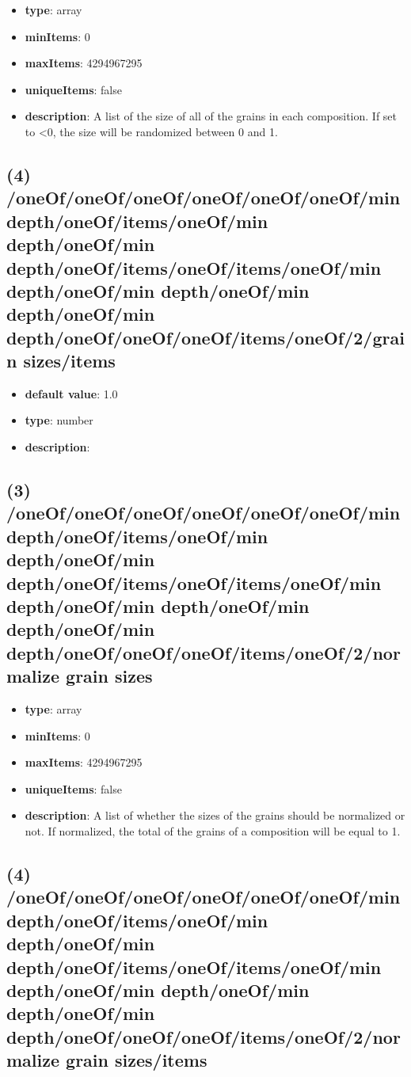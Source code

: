 \begin{itemize}[leftmargin=3em]\item {\bf type}: array
\item {\bf minItems}: 0
\item {\bf maxItems}: 4294967295
\item {\bf uniqueItems}: false
\item {\bf description}: A list of the size of all of the grains in each composition. If set to <0, the size will be randomized between 0 and 1.
\end{itemize}\subsection{(4) /oneOf/oneOf/oneOf/oneOf/oneOf/oneOf/min depth/oneOf/items/oneOf/min depth/oneOf/min depth/oneOf/items/oneOf/items/oneOf/min depth/oneOf/min depth/oneOf/min depth/oneOf/min depth/oneOf/oneOf/oneOf/items/oneOf/2/grain sizes/items}
\begin{itemize}[leftmargin=4em]\item {\bf default value}: 1.0
\item {\bf type}: number
\item {\bf description}: 
\end{itemize}\subsection{(3) /oneOf/oneOf/oneOf/oneOf/oneOf/oneOf/min depth/oneOf/items/oneOf/min depth/oneOf/min depth/oneOf/items/oneOf/items/oneOf/min depth/oneOf/min depth/oneOf/min depth/oneOf/min depth/oneOf/oneOf/oneOf/items/oneOf/2/normalize grain sizes}
\begin{itemize}[leftmargin=3em]\item {\bf type}: array
\item {\bf minItems}: 0
\item {\bf maxItems}: 4294967295
\item {\bf uniqueItems}: false
\item {\bf description}: A list of whether the sizes of the grains should be normalized or not. If normalized, the total of the grains of a composition will be equal to 1.
\end{itemize}\subsection{(4) /oneOf/oneOf/oneOf/oneOf/oneOf/oneOf/min depth/oneOf/items/oneOf/min depth/oneOf/min depth/oneOf/items/oneOf/items/oneOf/min depth/oneOf/min depth/oneOf/min depth/oneOf/min depth/oneOf/oneOf/oneOf/items/oneOf/2/normalize grain sizes/items}
